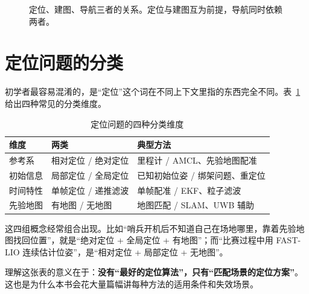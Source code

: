\begin{figure}[htbp]
  \centering
  \caption{定位、建图、导航三者的关系。定位与建图互为前提，导航同时依赖两者。}
  \label{fig:01-triangle}
\end{figure}

\section{定位问题的分类}\label{sec:01-taxonomy}

初学者最容易混淆的，是“定位”这个词在不同上下文里指的东西完全不同。表~\ref{tab:01-loc-types} 给出四种常见的分类维度。

\begin{table}[htbp]
  \centering
  \caption{定位问题的四种分类维度}\label{tab:01-loc-types}
  \small
  \begin{tabular}{p{2.6cm}p{4.4cm}p{5.6cm}}
    \toprule
    维度 & 两类 & 典型方法 \\
    \midrule
    参考系 & 相对定位 / 绝对定位 & 里程计 / AMCL、先验地图配准 \\
    初始信息 & 局部定位 / 全局定位 & 已知初始位姿 / 绑架问题、重定位 \\
    时间特性 & 单帧定位 / 递推滤波 & 单帧配准 / EKF、粒子滤波 \\
    先验地图 & 有地图 / 无地图 & 地图匹配 / SLAM、UWB 辅助 \\
    \bottomrule
  \end{tabular}
\end{table}

这四组概念经常组合出现。比如“哨兵开机后不知道自己在场地哪里，靠着先验地图找回位置”，就是“绝对定位 + 全局定位 + 有地图”；而“比赛过程中用 FAST-LIO 连续估计位姿”，是“相对定位 + 局部定位 + 无地图”。

理解这张表的意义在于：\textbf{没有“最好的定位算法”，只有“匹配场景的定位方案”}。这也是为什么本书会花大量篇幅讲每种方法的适用条件和失效场景。

